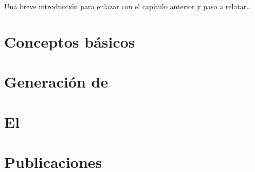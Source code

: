Una breve introducción para enlazar con el capítulo anterior y paso a relatar\ldots




\section{Conceptos básicos}
\label{sec:arm:conceptos-basicos}





\section{\fim}
\label{sec:arm:fim}





\section{Generación de \ars}
\label{sec:arm:generacion-ar}





\section{El \IR}
\label{sec:arm:el-item-raro}





\section{Publicaciones}
\label{sec:arm:publicaciones}

